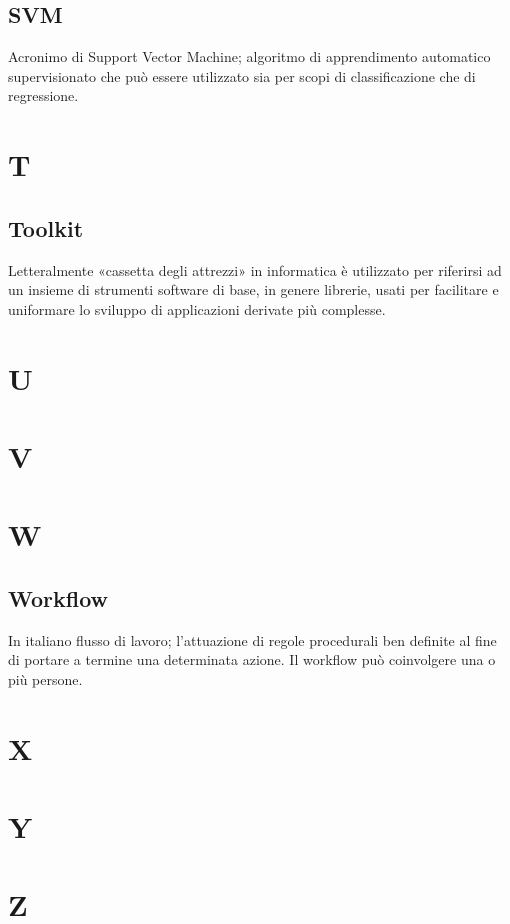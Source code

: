 \subsection*{SVM}
Acronimo di Support Vector Machine; algoritmo di apprendimento automatico supervisionato che può essere utilizzato sia per scopi di classificazione che di regressione.

\clearpage
\section*{T}

\subsection*{Toolkit}
Letteralmente «cassetta degli attrezzi» in informatica è utilizzato per riferirsi ad un insieme di strumenti software di base, in genere librerie, usati per facilitare e uniformare lo sviluppo di applicazioni derivate più complesse. 

\clearpage
\section*{U}

\clearpage
\section*{V}


\clearpage
\section*{W}

\subsection*{Workflow}
In italiano flusso di lavoro; l'attuazione di regole procedurali ben definite al fine di portare a termine una determinata azione. Il workflow può coinvolgere una o più persone.


\clearpage
\section*{X}

\clearpage
\section*{Y}

\clearpage
\section*{Z}
